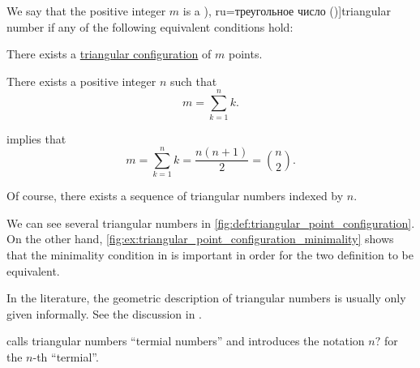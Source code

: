 \begin{definition}\label{def:triangular_number}
  We say that the positive integer \( m \) is a \term[en=triangular number (\cite[1]{Deza2012FigurateNumbers}), ru=треугольное число (\cite[14]{АлександровМаркушевичХинчин1963ЭнциклопедияТом4})]{triangular number} if any of the following equivalent conditions hold:
  \begin{thmenum}
     There exists a \hyperref[def:triangular_point_configuration]{triangular configuration} of \( m \) points.

     There exists a positive integer \( n \) such that
    \begin{equation}\label{eq:def:triangular_number/arithmetic}
      m = \sum_{k=1}^n k.
    \end{equation}
  \end{thmenum}
\end{definition}
\begin{comments}
  \item {} implies that
  \begin{equation*}
    m = \sum_{k=1}^n k = \frac {n(n + 1)} 2 = \binom n 2.
  \end{equation*}

  \item Of course, there exists a sequence of triangular numbers indexed by \( n \).

  \item We can see several triangular numbers in \cref{fig:def:triangular_point_configuration}. On the other hand, \cref{fig:ex:triangular_point_configuration_minimality} shows that the minimality condition in  is important in order for the two definition to be equivalent.

  \item In the literature, the geometric description of triangular numbers is usually only given informally. See the discussion in .

  \item {} calls triangular numbers \enquote{termial numbers} and introduces the notation \( n? \) for the \( n \)-th \enquote{termial}.
\end{comments}
